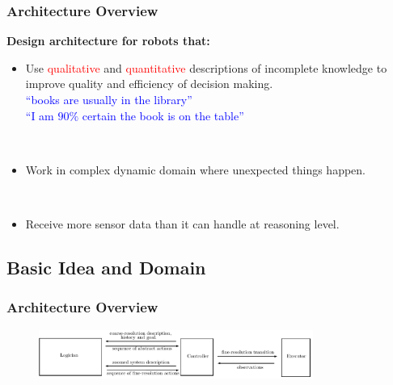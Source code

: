 \documentclass[xcolor=dvipsnames]{beamer}
\begin{document}
\begin{frame}\frametitle{Architecture Overview} 
  \textbf{Design architecture for robots that:}
  \begin{itemize}
  \item Use \textcolor{red}{qualitative} and
    \textcolor{red}{quantitative} descriptions of incomplete knowledge
    to improve quality and efficiency of decision making.\\
    \textcolor{blue}{``books are usually in
the library''}\\
    \textcolor{blue}{``I am $90\%$ certain the book is on the
      table''}

    \ \\
   \item Work in complex dynamic domain where unexpected things happen.

    \ \\
    \item Receive more sensor data than it can handle at reasoning level. 

  \end{itemize}
\end{frame}



\subsection{Basic Idea and Domain}

\begin{frame}\frametitle{Architecture Overview}
  \begin{figure}
    \includegraphics[width=0.8\textwidth]{Images/architecture}
  \end{figure}

\end{frame}
\end{document}
